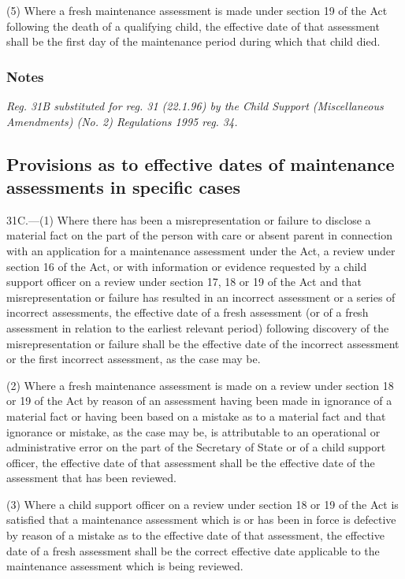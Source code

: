 \documentclass[a4paper]{article}
\newcommand\amendment[1]{\subsubsection*{Notes}{\itshape\frenchspacing\footnotesize #1 \par}}
\begin{document}
(5) Where a fresh maintenance assessment is made under section 19 of the Act following the death of a qualifying child, the effective date of that assessment shall be the first day of the maintenance period during which that child died.

\amendment{
Reg. 31B substituted for reg. 31 (22.1.96) by the Child Support (Miscellaneous Amendments) (No. 2) Regulations 1995 reg. 34.
}

\subsection[31C. Provisions as to effective dates of maintenance assessments in specific cases]{Provisions as to effective dates of maintenance assessments in specific cases}

31C.—(1) Where there has been a misrepresentation or failure to disclose a material fact on the part of the person with care or absent parent in connection with an application for a maintenance assessment under the Act, a review under section 16 of the Act, or with information or evidence requested by a child support officer on a review under section 17, 18 or 19 of the Act and that misrepresentation or failure has resulted in an incorrect assessment or a series of incorrect assessments, the effective date of a fresh assessment (or of a fresh assessment in relation to the earliest relevant period) following discovery of the misrepresentation or failure shall be the effective date of the incorrect assessment or the first incorrect assessment, as the case may be.

(2) Where a fresh maintenance assessment is made on a review under section 18 or 19 of the Act by reason of an assessment having been made in ignorance of a material fact or having been based on a mistake as to a material fact and that ignorance or mistake, as the case may be, is attributable to an operational or administrative error on the part of the Secretary of State or of a child support officer, the effective date of that assessment shall be the effective date of the assessment that has been reviewed.

(3) Where a child support officer on a review under section 18 or 19 of the Act is satisfied that a maintenance assessment which is or has been in force is defective by reason of a mistake as to the effective date of that assessment, the effective date of a fresh assessment shall be 
the correct effective date applicable to the maintenance assessment which is being reviewed.  %
\end{document}
